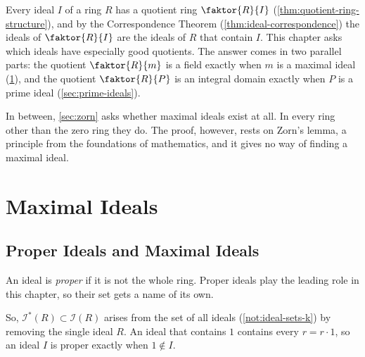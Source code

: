 Every ideal $I$ of a ring $R$ has a quotient ring $\faktor{R}{I}$ (\cref{thm:quotient-ring-structure}), and by the Correspondence Theorem (\cref{thm:ideal-correspondence}) the ideals of $\faktor{R}{I}$ are the ideals of $R$ that contain $I$. This chapter asks which ideals have especially good quotients. The answer comes in two parallel parts: the quotient $\faktor{R}{m}$ is a field exactly when $m$ is a maximal ideal (\cref{sec:maximal-ideals}), and the quotient $\faktor{R}{P}$ is an integral domain exactly when $P$ is a prime ideal (\cref{sec:prime-ideals}).

In between, \cref{sec:zorn} asks whether maximal ideals exist at all. In every ring other than the zero ring they do. The proof, however, rests on Zorn's lemma, a principle from the foundations of mathematics, and it gives no way of finding a maximal ideal.

\section{Maximal Ideals}\label{sec:maximal-ideals}

\subsection{Proper Ideals and Maximal Ideals}

An ideal is \emph{proper} if it is not the whole ring. Proper ideals play the leading role in this chapter, so their set gets a name of its own.


So, $\mathscr{I}^*(R) \subset \mathscr{I}(R)$ arises from the set of all ideals (\cref{not:ideal-sets-k}) by removing the single ideal $R$. An ideal that contains $1$ contains every $r = r \cdot 1$, so an ideal $I$ is proper exactly when $1 \notin I$.


